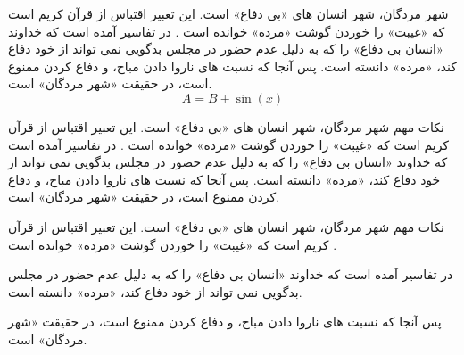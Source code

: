 \begin{info}
شهر مردگان، شهر انسان های «بی دفاع» است. این تعبیر اقتباس از قرآن کریم است که «غیبت» را خوردن گوشت «مرده» خوانده است . 
در تفاسیر آمده است که خداوند «انسان بی دفاع» را که به دلیل عدم حضور در مجلس بدگویی نمی تواند از خود دفاع کند، «مرده» دانسته است. پس آنجا که نسبت های ناروا دادن مباح، و دفاع کردن ممنوع است، در حقیقت «شهر مردگان» است.
\begin{equation}
A = B + \sin (x)
\end{equation}
\end{info}

\begin{warning}{نکات مهم}
شهر مردگان، شهر انسان های «بی دفاع» است. این تعبیر اقتباس از قرآن کریم است که «غیبت» را خوردن گوشت «مرده» خوانده است . در تفاسیر آمده است که خداوند «انسان بی دفاع» را که به دلیل عدم حضور در مجلس بدگویی نمی تواند از خود دفاع کند، «مرده» دانسته است. پس آنجا که نسبت های ناروا دادن مباح، و دفاع کردن ممنوع است، در حقیقت «شهر مردگان» است.
\end{warning}


\begin{goal}{نکات مهم}
شهر مردگان، شهر انسان های «بی دفاع» است. این تعبیر اقتباس از قرآن کریم است که «غیبت» را خوردن گوشت «مرده» خوانده است . 

در تفاسیر آمده است که خداوند «انسان بی دفاع» را که به دلیل عدم حضور در مجلس بدگویی نمی تواند از خود دفاع کند، «مرده» دانسته است.

  پس آنجا که نسبت های ناروا دادن مباح، و دفاع کردن ممنوع است، در حقیقت «شهر مردگان» است.
\end{goal}

